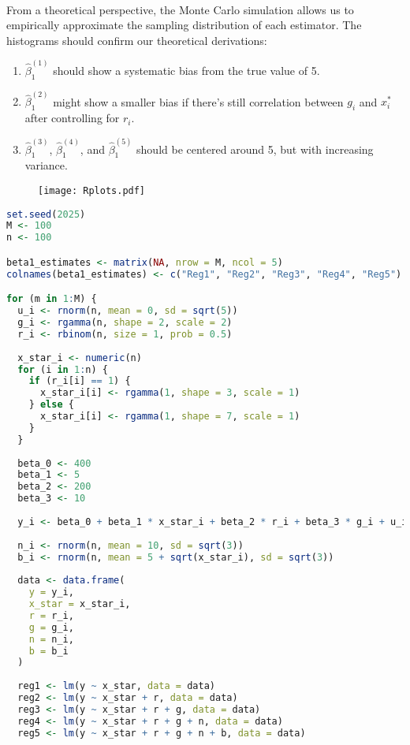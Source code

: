 \documentclass[a4paper,12pt]{article} %
\theoremstyle{nonitalic}
\newenvironment{solution}[1]
  {\renewcommand\theinnercustomsol{#1}\innercustomsol}
  {\endinnercustomsol}
\newcounter{solutionctr}
\renewcommand{\thesolutionctr}{(\alph{solutionctr})}
\newenvironment{autosolution}
  {\stepcounter{solutionctr}\begin{solution}{\thesolutionctr}}
  {\end{solution}}
\begin{document}
\begin{autosolution}
\ 

From a theoretical perspective, the Monte Carlo simulation allows us to empirically approximate the sampling distribution of each estimator. The histograms should confirm our theoretical derivations:
\begin{enumerate}
    \item $\hat{\beta}_1^{(1)}$ should show a systematic bias from the true value of 5.
    \item $\hat{\beta}_1^{(2)}$ might show a smaller bias if there's still correlation between $g_i$ and $x^*_i$ after controlling for $r_i$.
    \item $\hat{\beta}_1^{(3)}$, $\hat{\beta}_1^{(4)}$, and $\hat{\beta}_1^{(5)}$ should be centered around 5, but with increasing variance.
\end{enumerate}

\begin{figure}[H]
  \centering
  \texttt{[image: Rplots.pdf]}
  \label{fig:monte_carlo_results}
\end{figure}

\begin{lstlisting}[language=R]
set.seed(2025)
M <- 100
n <- 100

beta1_estimates <- matrix(NA, nrow = M, ncol = 5)
colnames(beta1_estimates) <- c("Reg1", "Reg2", "Reg3", "Reg4", "Reg5")

for (m in 1:M) {
  u_i <- rnorm(n, mean = 0, sd = sqrt(5))
  g_i <- rgamma(n, shape = 2, scale = 2)
  r_i <- rbinom(n, size = 1, prob = 0.5)
    
  x_star_i <- numeric(n)
  for (i in 1:n) {
    if (r_i[i] == 1) {
      x_star_i[i] <- rgamma(1, shape = 3, scale = 1)
    } else {
      x_star_i[i] <- rgamma(1, shape = 7, scale = 1)
    }
  }
    
  beta_0 <- 400
  beta_1 <- 5
  beta_2 <- 200
  beta_3 <- 10
    
  y_i <- beta_0 + beta_1 * x_star_i + beta_2 * r_i + beta_3 * g_i + u_i
    
  n_i <- rnorm(n, mean = 10, sd = sqrt(3))
  b_i <- rnorm(n, mean = 5 + sqrt(x_star_i), sd = sqrt(3))
    
  data <- data.frame(
    y = y_i,
    x_star = x_star_i,
    r = r_i,
    g = g_i,
    n = n_i,
    b = b_i
  )
  
  reg1 <- lm(y ~ x_star, data = data)
  reg2 <- lm(y ~ x_star + r, data = data)
  reg3 <- lm(y ~ x_star + r + g, data = data)
  reg4 <- lm(y ~ x_star + r + g + n, data = data)
  reg5 <- lm(y ~ x_star + r + g + n + b, data = data)
    

\end{lstlisting}
\end{autosolution}
\end{document}
